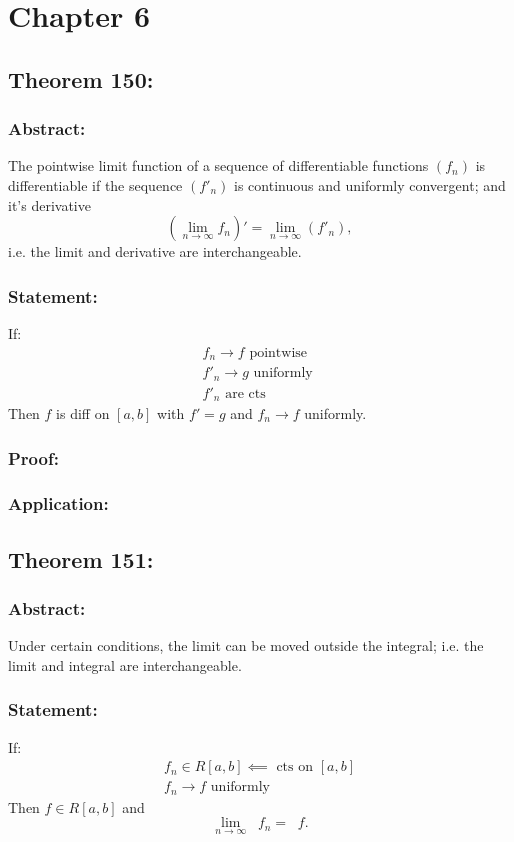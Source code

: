 \documentclass{article}
\DeclareMathOperator\inti{\int_{a}^{b}}
\begin{document}
\section*{Chapter 6}
\subsection{Theorem 150:}
\subsubsection*{Abstract:}
The pointwise limit function of a sequence of
differentiable functions $(f_n)$ is differentiable
if the sequence $(f'_n)$ is continuous and uniformly convergent; and it's derivative
$$
(\lim_{n \to \infty}f_n)' = \lim_{n \to \infty}(f'_n),
$$
i.e. the limit and derivative are interchangeable.
\subsubsection*{Statement:}
If: \begin{gather}
f_n \to f \text{ pointwise } \\
f'_n \to g \text{ uniformly } \\
f'_n \text{ are cts }
\end{gather}
Then $f$ is diff on $[a,b]$ with $f' = g$ and $f_n \to f$ uniformly.
\subsubsection*{Proof:}

\subsubsection*{Application:}

\subsection{Theorem 151:}
\subsubsection*{Abstract:}
Under certain conditions, the limit can be moved outside the integral;
i.e. the limit and integral are interchangeable.
\subsubsection*{Statement:}
If: \begin{gather}
f_n \in R[a,b] \impliedby \text{ cts on $[a,b]$} \\
f_n \to f \text{ uniformly }
\end{gather}
Then $f \in R[a,b]$ and $$
\lim_{n \to \infty} \inti f_n = \inti f.
$$
\end{document}
